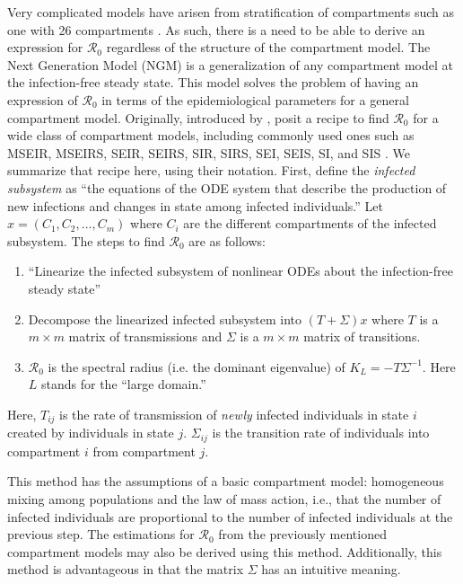 \documentclass[12pt]{article}
\newcommand{\rr}{\ensuremath{\mathcal{R}_0}}
\begin{document}
Very complicated models have arisen from stratification of compartments such as one with 26 compartments \citep{pandey2014}.  As such, there is a need to be able to derive an expression for $\rr$ regardless of the structure of the compartment model.   The Next Generation Model (NGM) is a generalization of any compartment model at the infection-free steady state. This model solves the problem of having an expression of $\rr$ in terms of the epidemiological parameters for a general compartment model.  Originally, introduced by \citep{diekmann1990}, \cite{diekmann2009} posit a recipe to find $\rr$ for a wide class of compartment models, including commonly used ones such as MSEIR, MSEIRS, SEIR, SEIRS, SIR, SIRS, SEI, SEIS, SI, and SIS \citep{hethcote2000}. We summarize that recipe here, using their notation.  First, define the \textit{infected subsystem} as ``the equations of the ODE system that describe the production of new infections and changes in state among infected individuals.''  Let $x = (C_1, C_2, \dots, C_m)$ where $C_i$ are the different compartments of the infected subsystem.  The steps to find $\rr$ are as follows:


\begin{enumerate}
\item ``Linearize the infected subsystem of nonlinear ODEs about the infection-free steady state''
\item Decompose the linearized infected subsystem into $(T + \Sigma )x$ where $T$ is a $m\times m$ matrix of transmissions and $\Sigma$ is a $m \times m$ matrix of transitions.
\item $\rr$ is the spectral radius (i.e. the dominant eigenvalue) of $K_L=-T \Sigma^{-1}$.  Here $L$ stands for the ``large domain.''
\end{enumerate}

Here, $T_{ij}$ is the rate of transmission of \textit{newly} infected individuals in state $i$ created by individuals in state $j$.  $\Sigma_{ij}$ is the transition rate of individuals into compartment $i$ from compartment $j$.

This method has the assumptions of a basic compartment model: homogeneous mixing among populations and the law of mass action, i.e., that the number of infected individuals are proportional to the number of infected individuals at the previous step.  The estimations for $\rr$ from the previously mentioned compartment models may also be derived using this method.  Additionally, this method is advantageous in that the matrix $\Sigma$ has an intuitive meaning.
\end{document}
